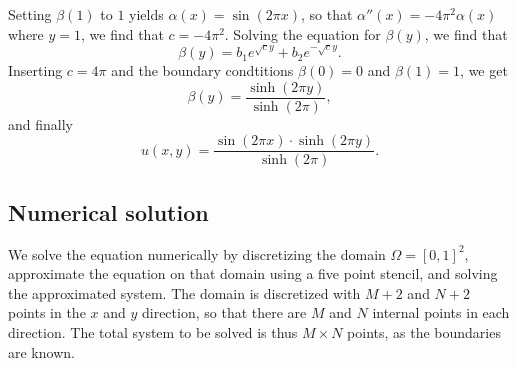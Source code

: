 Setting $\beta(1)$ to $1$ yields $\alpha(x) = \sin(2\pi x)$, so that $\alpha''(x) = -4\pi^2\alpha(x)$ where $y = 1$, we find that $c = -4\pi^2$.
Solving the equation for $\beta(y)$, we find that
\begin{equation*}
    \beta(y) = b_1 e^{\sqrt{c} y} + b_2 e^{-\sqrt{c} y}.
\end{equation*}
Inserting $c = 4\pi$ and the boundary condtitions $\beta(0) = 0$ and $\beta(1) = 1$, we get
\begin{equation*}
    \beta(y) = \frac{\sinh(2\pi y)}{\sinh(2\pi)},
\end{equation*}
and finally
\begin{equation*}
    u(x,y) = \frac{\sin(2\pi x) \cdot \sinh(2\pi y)}{\sinh(2\pi)}.
\end{equation*}

\subsection{Numerical solution}
\label{sec:exc3:numerical}
We solve the equation numerically by discretizing the domain $\Omega = [0, 1]^2$, approximate the equation on that domain using a five point stencil, and solving the approximated system.
The domain is discretized with $M+2$ and $N+2$ points in the $x$ and $y$ direction, so that there are $M$ and $N$ internal points in each direction.
The total system to be solved is thus $M \times N$ points, as the boundaries are known.

